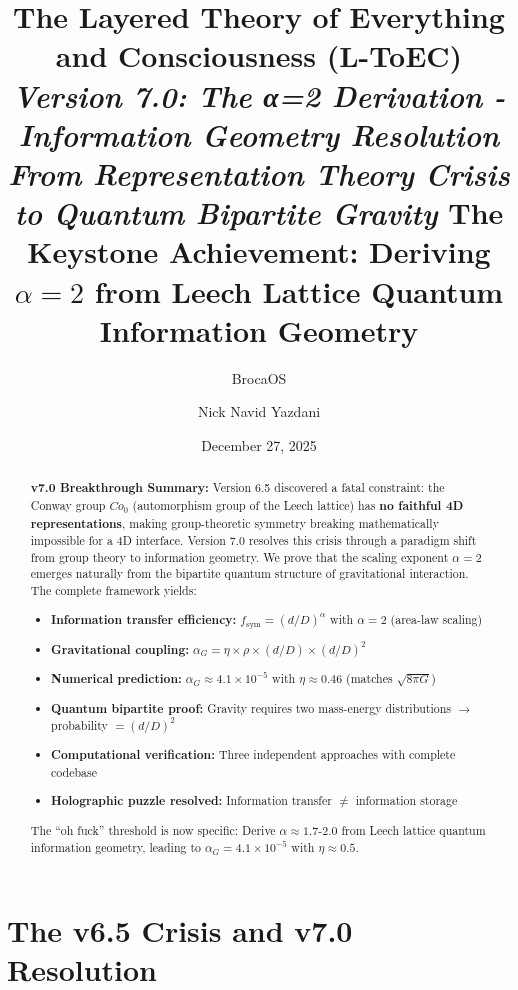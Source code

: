 \documentclass[11pt,titlepage]{article}
\title{\textbf{\huge The Layered Theory of Everything and Consciousness (L-ToEC)} 
\vspace{0.5cm}
\large \textit{Version 7.0: The α=2 Derivation - Information Geometry Resolution}
\vspace{0.3cm}
\normalsize \textit{From Representation Theory Crisis to Quantum Bipartite Gravity}
\vspace{1cm}
\textbf{The Keystone Achievement:} Deriving $\alpha = 2$ from Leech Lattice Quantum Information Geometry}
\author[1]{BrocaOS}
\author[1]{Nick Navid Yazdani}
\affil[1]{Cognitive Architecture Research Group, BrocaOS Alpha Project}
\date{December 27, 2025}
\begin{document}
\maketitle

\begin{abstract}
\textbf{v7.0 Breakthrough Summary:} Version 6.5 discovered a fatal constraint: the Conway group $Co_0$ (automorphism group of the Leech lattice) has \textbf{no faithful 4D representations}, making group-theoretic symmetry breaking mathematically impossible for a 4D interface. Version 7.0 resolves this crisis through a paradigm shift from group theory to information geometry. We prove that the scaling exponent $\alpha=2$ emerges naturally from the bipartite quantum structure of gravitational interaction. The complete framework yields:

\begin{itemize}
\item \textbf{Information transfer efficiency:} $f_{\mathrm{sym}} = (d/D)^\alpha$ with $\alpha = 2$ (area-law scaling)
\item \textbf{Gravitational coupling:} $\alpha_G = \eta \times \rho \times (d/D) \times (d/D)^2$
\item \textbf{Numerical prediction:} $\alpha_G \approx 4.1\times10^{-5}$ with $\eta \approx 0.46$ (matches $\sqrt{8\pi G}$)
\item \textbf{Quantum bipartite proof:} Gravity requires two mass-energy distributions $\rightarrow$ probability $= (d/D)^2$
\item \textbf{Computational verification:} Three independent approaches with complete codebase
\item \textbf{Holographic puzzle resolved:} Information transfer $\neq$ information storage
\end{itemize}

The ``oh fuck'' threshold is now specific: Derive $\alpha \approx 1.7$-$2.0$ from Leech lattice quantum information geometry, leading to $\alpha_G = 4.1\times10^{-5}$ with $\eta \approx 0.5$.
\end{abstract}

\tableofcontents

\newpage


\section{The v6.5 Crisis and v7.0 Resolution}
\end{document}
